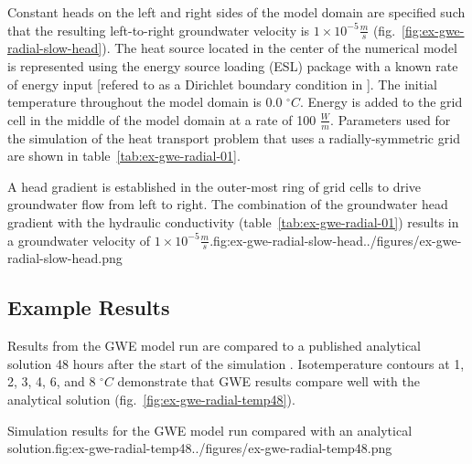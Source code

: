 Constant heads on the left and right sides of the model domain are specified such that the resulting left-to-right groundwater velocity is $1 \times 10^{-5} \tfrac{m}{s}$ (fig.~\ref{fig:ex-gwe-radial-slow-head}).  The heat source located in the center of the numerical model is represented using the energy source loading (ESL) package with a known rate of energy input [refered to as a Dirichlet boundary condition in \cite{alKhoury2020}].  The initial temperature throughout the model domain is 0.0 $^{\circ}C$. Energy is added to the grid cell in the middle of the model domain at a rate of 100 $\tfrac{W}{m}$.  Parameters used for the \mf simulation of the heat transport problem that uses a radially-symmetric grid are shown in table~\ref{tab:ex-gwe-radial-01}.



\begin{StandardFigure}{
    A head gradient is established in the outer-most ring of grid cells to drive groundwater flow from left to right. The combination of the groundwater head gradient with the hydraulic conductivity (table~\ref{tab:ex-gwe-radial-01}) results in a groundwater velocity of $1 \times 10^{-5} \tfrac{m}{s}$.}{fig:ex-gwe-radial-slow-head}{../figures/ex-gwe-radial-slow-head.png}
\end{StandardFigure}

\subsection{Example Results}

Results from the GWE model run are compared to a published analytical solution 48 hours after the start of the simulation \citep{alKhoury2020}.  Isotemperature contours at 1, 2, 3, 4, 6, and 8 $^{\circ}C$ demonstrate that GWE results compare well with the analytical solution (fig.~\ref{fig:ex-gwe-radial-temp48}).

\begin{StandardFigure}{
    Simulation results for the GWE model run compared with an analytical solution.}{fig:ex-gwe-radial-temp48}{../figures/ex-gwe-radial-temp48.png}
\end{StandardFigure}
